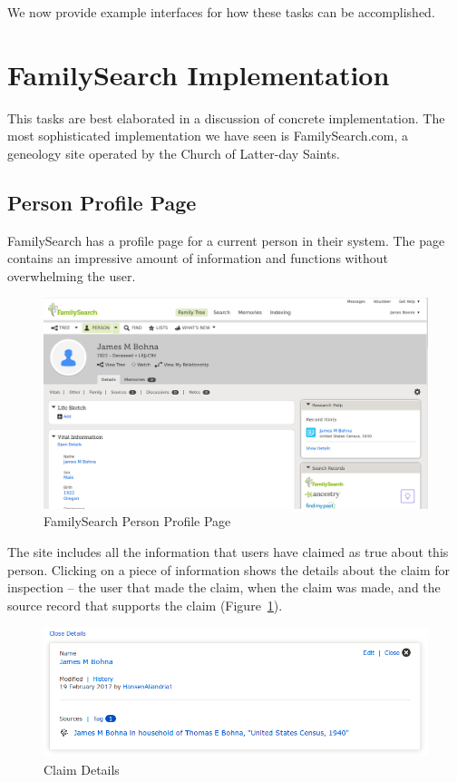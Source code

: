 \documentclass[format=siggraph, review=true]{acmart}
\begin{document}
We now provide example interfaces for how these tasks can be
accomplished.

\section*{FamilySearch Implementation}
This tasks are best elaborated in a discussion of concrete
implementation. The most sophisticated implementation we have seen is
FamilySearch.com, a geneology site operated by the Church of
Latter-day Saints. 

\subsection*{Person Profile Page}
FamilySearch has a profile page for a current person in their
system. The page contains an impressive amount of information and
functions without overwhelming the user.

\begin{figure}[h]

\includegraphics[width=\columnwidth]{images/familysearch/person-detail-1.png}

\caption{FamilySearch Person Profile Page}
\end{figure}

The site includes all the information that users have claimed as true
about this person. Clicking on a piece of information shows the
details about the claim for inspection -- the user that made the
claim, when the claim was made, and the source record that supports
the claim (Figure~\ref{fig:name-detail}).

\begin{figure}[h]
\includegraphics[width=\columnwidth]{images/familysearch/name-detail.png}
\caption{Claim Details}
\label{fig:name-detail}
\end{figure}
\end{document}
